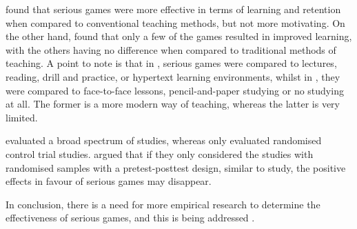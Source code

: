 \documentclass[a4paper,11.5pt]{report}
\numberwithin{figure}{section}
\numberwithin{table}{section}
\numberwithin{equation}{section}
\numberwithin{equation}{section}
\begin{document}
\citeauthor{Pieter2013} found that serious games were more effective in terms of learning and retention when compared to conventional teaching methods, but not more motivating. On the other hand, \citeauthor{Girard2013} found that only a few of the games resulted in improved learning, with the others having no difference when compared to traditional methods of teaching. A point to note is that in \citet{Pieter2013}, serious games were compared to lectures, reading, drill and practice, or hypertext learning environments, whilst in \citet{Girard2013}, they were compared to face-to-face lessons, pencil-and-paper studying or no studying at all. The former is a more modern way of teaching, whereas the latter is very limited.

\citeauthor{Pieter2013} evaluated a broad spectrum of studies, whereas \citeauthor{Girard2013} only evaluated randomised control trial studies. \citeauthor{Pieter2013} argued that if they only considered the studies with randomised samples with a pretest-posttest design, similar to \citeauthor{Girard2013} study, the positive effects in favour of serious games may disappear. 

In conclusion, there is a need for more empirical research to determine the effectiveness of serious games, and this is being addressed \citep{Connolly2012}.






\end{document}
